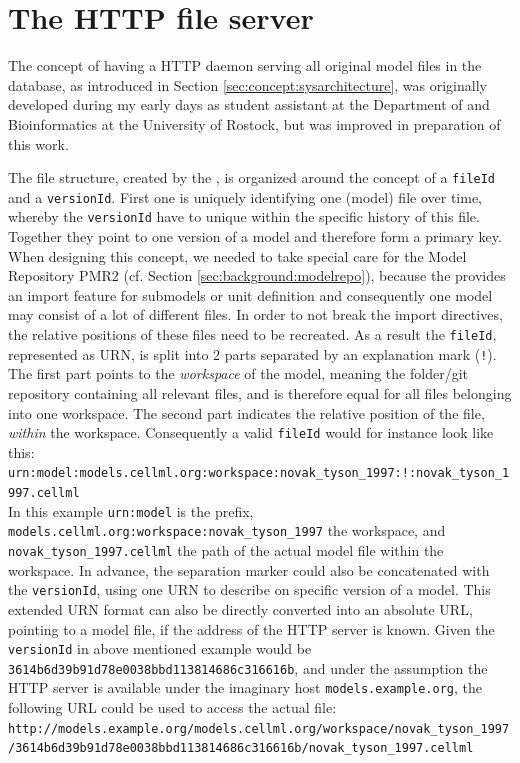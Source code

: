 \section{The HTTP file server}
\label{sec:concept:filestorage}

The concept of having a HTTP daemon serving all original model files in the \masymos database, as introduced in Section \ref{sec:concept:sysarchitecture}, was originally developed during my early days as student assistant at the Department of \sysbio and Bioinformatics at the University of Rostock, but was improved in preparation of this work.

The file structure, created by the \modelcrawler, is organized around the concept of a \texttt{fileId} and a \texttt{versionId}. First one is uniquely identifying one (model) file over time, whereby the \texttt{versionId} have to unique within the specific history of this file. Together they point to one version of a model and therefore form a primary key.
When designing this concept, we needed to take special care for the \cellml Model Repository PMR2 (cf. Section \ref{sec:background:modelrepo}), because the \cellml provides an import feature for submodels or unit definition and consequently one model may consist of a lot of different files. In order to not break the import directives, the relative positions of these files need to be recreated. As a result the \texttt{fileId}, represented as URN, is split into 2 parts separated by an explanation mark (\texttt{!}). The first part points to the \emph{workspace} of the model, meaning the folder/git repository containing all relevant files, and is therefore equal for all files belonging into one workspace. The second part indicates the relative position of the file, \emph{within} the workspace.
Consequently a valid \texttt{fileId} would for instance look like this:\\ \texttt{urn:model:models.cellml.org:workspace:novak\_tyson\_1997:!:novak\_tyson\_1997.cellml}\\
In this example \texttt{urn:model} is the prefix, \texttt{models.cellml.org:workspace:novak\_tyson\_1997} the workspace, and \texttt{novak\_tyson\_1997.cellml} the path of the actual model file within the workspace. In advance, the separation marker could also be concatenated with the \texttt{versionId}, using one URN to describe on specific version of a model. This extended URN format can also be directly converted into an absolute URL, pointing to a model file, if the address of the HTTP server is known.
Given the \texttt{versionId} in above mentioned example would be \texttt{3614b6d39b91d78e0038bbd113814686c316616b}, and under the assumption the HTTP server is available under the imaginary host \texttt{models.example.org}, the following URL could be used to access the actual file:\\
\texttt{http://models.example.org/models.cellml.org/workspace/novak\_tyson\_1997/3614b6d39b91d78e0038bbd113814686c316616b/novak\_tyson\_1997.cellml}

